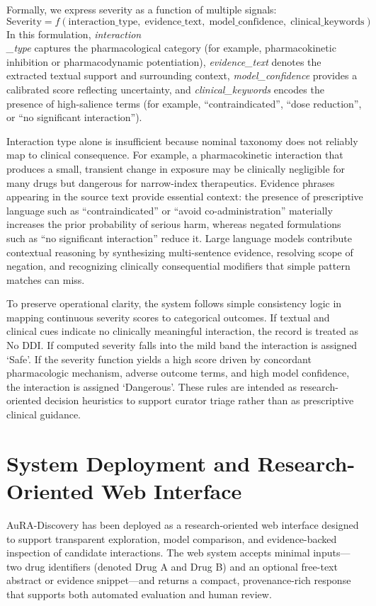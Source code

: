 \documentclass[conference]{Template/IEEEtran}
\begin{document}
Formally, we express severity as a function of multiple signals:
\[
\text{Severity} = f(\text{interaction\_type},\; \text{evidence\_text},\; \text{model\_confidence},\; \text{clinical\_keywords})
\]
In this formulation, \textit{interaction\\_type} captures the pharmacological category (for example, pharmacokinetic inhibition or pharmacodynamic potentiation), \textit{evidence\_text} denotes the extracted textual support and surrounding context, \textit{model\_confidence} provides a calibrated score reflecting uncertainty, and \textit{clinical\_keywords} encodes the presence of high-salience terms (for example, ``contraindicated'', ``dose reduction'', or ``no significant interaction'').

Interaction type alone is insufficient because nominal taxonomy does not reliably map to clinical consequence. For example, a pharmacokinetic interaction that produces a small, transient change in exposure may be clinically negligible for many drugs but dangerous for narrow-index therapeutics. Evidence phrases appearing in the source text provide essential context: the presence of prescriptive language such as ``contraindicated'' or ``avoid co-administration'' materially increases the prior probability of serious harm, whereas negated formulations such as ``no significant interaction'' reduce it. Large language models contribute contextual reasoning by synthesizing multi-sentence evidence, resolving scope of negation, and recognizing clinically consequential modifiers that simple pattern matches can miss.

To preserve operational clarity, the system follows simple consistency logic in mapping continuous severity scores to categorical outcomes. If textual and clinical cues indicate no clinically meaningful interaction, the record is treated as No DDI. If computed severity falls into the mild band the interaction is assigned `Safe'. If the severity function yields a high score driven by concordant pharmacologic mechanism, adverse outcome terms, and high model confidence, the interaction is assigned `Dangerous'. These rules are intended as research-oriented decision heuristics to support curator triage rather than as prescriptive clinical guidance.

\section{System Deployment and Research-Oriented Web Interface}
AuRA-Discovery has been deployed as a research-oriented web interface designed to support transparent exploration, model comparison, and evidence-backed inspection of candidate interactions. The web system accepts minimal inputs—two drug identifiers (denoted Drug A and Drug B) and an optional free-text abstract or evidence snippet—and returns a compact, provenance-rich response that supports both automated evaluation and human review.
\end{document}
